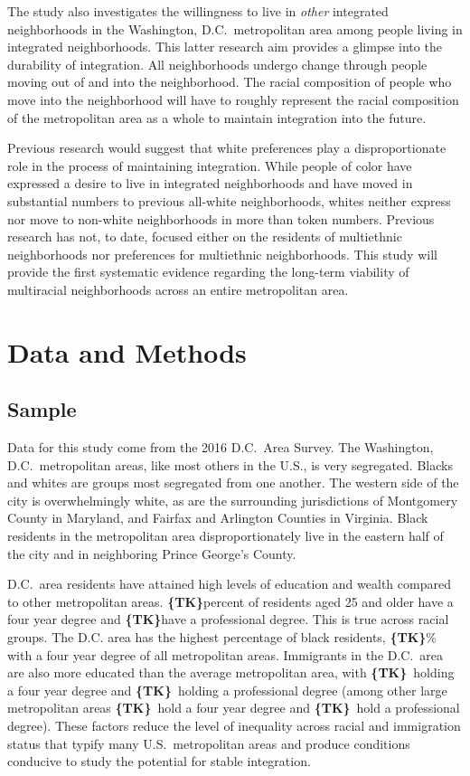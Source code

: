 \documentclass[11pt]{baderart}
\newcommand{\TK}{\textbf{\{TK\}}}
\begin{document}
The study also investigates the willingness to live in \emph{other} integrated neighborhoods in the Washington, D.C.\ metropolitan area among people living in integrated neighborhoods. This latter research aim provides a glimpse into the durability of integration. All neighborhoods undergo change through people moving out of and into the neighborhood. The racial composition of people who move into the neighborhood will have to roughly represent the racial composition of the metropolitan area as a whole to maintain integration into the future. 

Previous research would suggest that white preferences play a disproportionate role in the process of maintaining integration. While people of color have expressed a desire to live in integrated neighborhoods and have moved in substantial numbers to previous all-white neighborhoods, whites neither express nor move to non-white neighborhoods in more than token numbers. Previous research has not, to date, focused either on the residents of multiethnic neighborhoods nor preferences for multiethnic neighborhoods. This study will provide the first systematic evidence regarding the long-term viability of multiracial neighborhoods across an entire metropolitan area. 

\section{Data and Methods}
\subsection{Sample}
Data for this study come from the 2016 D.C.\ Area Survey. The Washington, D.C.\ metropolitan areas, like most others in the U.S., is very segregated. Blacks and whites are groups most segregated from one another. The western side of the city is overwhelmingly white, as are the surrounding jurisdictions of Montgomery County in Maryland, and Fairfax and Arlington Counties in Virginia. Black residents in the metropolitan area disproportionately live in the eastern half of the city and in neighboring Prince George's County. 

D.C.\ area residents have attained high levels of education and wealth compared to other metropolitan areas. \TK percent of residents aged 25 and older have a four year degree and \TK have a professional degree. This is true across racial groups. The D.C. area has the highest percentage of black residents, \TK\% with a four year degree of all metropolitan areas. Immigrants in the D.C.\ area are also more educated than the average metropolitan area, with \TK\ holding a four year degree and \TK\ holding a professional degree (among other large metropolitan areas \TK\ hold a four year degree and \TK\ hold a professional degree). These factors reduce the level of inequality across racial and immigration status that typify many U.S.\ metropolitan areas and produce conditions conducive to study the potential for stable integration.
\end{document}
